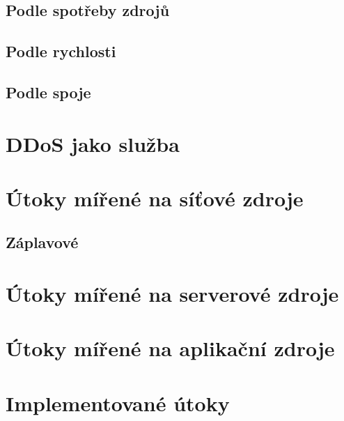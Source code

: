 \subsection{Podle spotřeby zdrojů}

\subsection{Podle rychlosti}

\subsection{Podle spoje}

\section{DDoS jako služba}

\section{Útoky mířené na síťové zdroje}

\subsection{Záplavové}

\section{Útoky mířené na serverové zdroje}

\section{Útoky mířené na aplikační zdroje}

\section{Implementované útoky}

